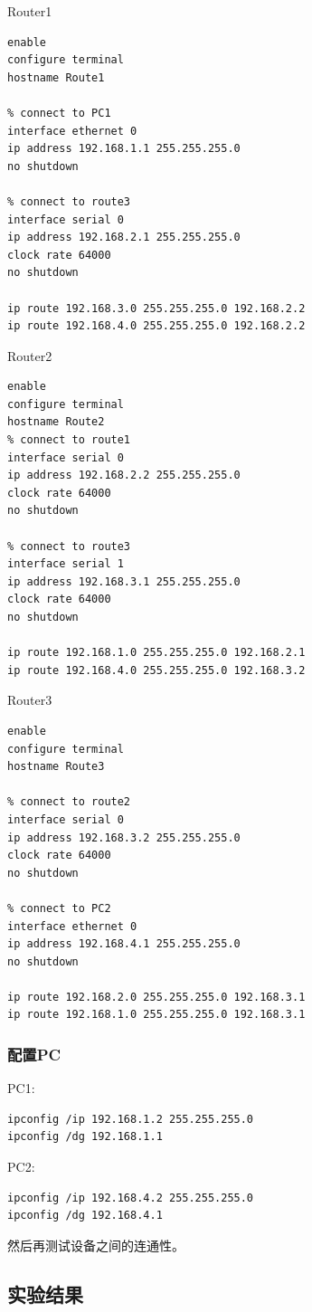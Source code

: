 \documentclass{article}
\begin{document}
Router1
\begin{lstlisting}
enable
configure terminal
hostname Route1

% connect to PC1
interface ethernet 0
ip address 192.168.1.1 255.255.255.0
no shutdown

% connect to route3
interface serial 0
ip address 192.168.2.1 255.255.255.0
clock rate 64000
no shutdown

ip route 192.168.3.0 255.255.255.0 192.168.2.2
ip route 192.168.4.0 255.255.255.0 192.168.2.2
\end{lstlisting}
Router2
\begin{lstlisting}
enable
configure terminal
hostname Route2
% connect to route1
interface serial 0
ip address 192.168.2.2 255.255.255.0
clock rate 64000
no shutdown

% connect to route3
interface serial 1
ip address 192.168.3.1 255.255.255.0
clock rate 64000
no shutdown

ip route 192.168.1.0 255.255.255.0 192.168.2.1
ip route 192.168.4.0 255.255.255.0 192.168.3.2
\end{lstlisting}

Router3
\begin{lstlisting}
enable
configure terminal
hostname Route3

% connect to route2
interface serial 0
ip address 192.168.3.2 255.255.255.0
clock rate 64000
no shutdown

% connect to PC2
interface ethernet 0
ip address 192.168.4.1 255.255.255.0
no shutdown

ip route 192.168.2.0 255.255.255.0 192.168.3.1
ip route 192.168.1.0 255.255.255.0 192.168.3.1
\end{lstlisting}

\subsubsection{配置PC}
PC1:
\begin{lstlisting}
ipconfig /ip 192.168.1.2 255.255.255.0
ipconfig /dg 192.168.1.1
\end{lstlisting}

PC2:
\begin{lstlisting}
ipconfig /ip 192.168.4.2 255.255.255.0
ipconfig /dg 192.168.4.1
\end{lstlisting}


然后再测试设备之间的连通性。


\subsection{实验结果}
\end{document}
